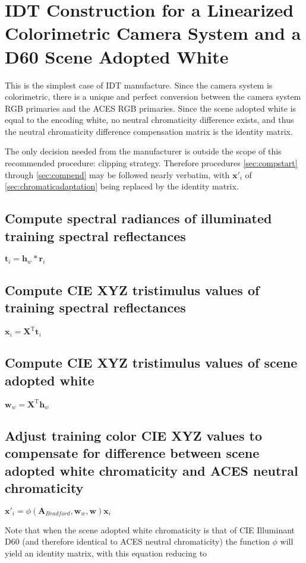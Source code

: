 \label{appendixA}

\section{IDT Construction for a Linearized Colorimetric Camera System and a D60 Scene Adopted White}
\label{sec:a1}
This is the simplest case of IDT manufacture. Since the camera system is colorimetric, there is a unique and perfect conversion between the camera system RGB primaries and the ACES RGB primaries. Since the scene adopted white is equal to the encoding white, no neutral chromaticity difference exists, and thus the neutral chromaticity difference compensation matrix is the identity matrix.


The only decision needed from the manufacturer is outside the scope of this recommended procedure: clipping strategy. Therefore procedures \autoref{sec:compstart} through \autoref{sec:compend} may be followed nearly verbatim, with $\mathbf{x}'_i$ of \autoref{sec:chromaticadaptation} being replaced by the identity matrix.


\subsection{Compute spectral radiances of illuminated training spectral reflectances}
$\mathbf{t}_i=\mathbf{h}_w*\mathbf{r}_i$

\subsection{Compute CIE XYZ tristimulus values of training spectral reflectances}
$\mathbf{x}_i=\mathbf{X}^\mathrm{T}\mathbf{t}_i$

\subsection{Compute CIE XYZ tristimulus values of scene adopted white}
$\mathbf{w}_w=\mathbf{X}^\mathrm{T}\mathbf{h}_w$

\subsection{Adjust training color CIE XYZ values to compensate for difference between scene adopted white chromaticity and ACES neutral chromaticity}
$\mathbf{x}'_i = \phi(\mathbf{A}_{Bradford},\mathbf{w}_w,\mathbf{w})\mathbf{x}_i$

Note that when the scene adopted white chromaticity is that of CIE Illuminant D60 (and therefore identical to ACES neutral chromaticity) the function $\phi$ will yield an identity matrix, with this equation reducing to

